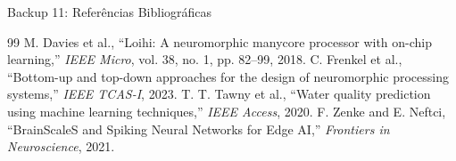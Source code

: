 \documentclass[aspectratio=169,10pt]{beamer}
\begin{document}
\begin{frame}{Backup 11: Referências Bibliográficas}
  \tiny
  \begin{thebibliography}{99}
     M. Davies et al., ``Loihi: A neuromorphic manycore processor with on-chip learning,'' \textit{IEEE Micro}, vol. 38, no. 1, pp. 82--99, 2018.
     C. Frenkel et al., ``Bottom-up and top-down approaches for the design of neuromorphic processing systems,'' \textit{IEEE TCAS-I}, 2023.
     T. T. Tawny et al., ``Water quality prediction using machine learning techniques,'' \textit{IEEE Access}, 2020.
     F. Zenke and E. Neftci, ``BrainScaleS and Spiking Neural Networks for Edge AI,'' \textit{Frontiers in Neuroscience}, 2021.
  \end{thebibliography}
\end{frame}
\end{document}
